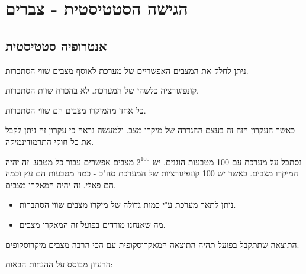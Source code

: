 \documentclass{tstextbook}
\begin{document}
\chapter{הגישה הסטטיסטית - צברים}

\section{אנטרופיה סטטיסטית}

\begin{definition}
ניתן לחלק את המצבים האפשריים של מערכת לאוסף מצבים שווי הסתברות.

\end{definition}
\begin{definition}
קונפיגורציה כלשהי של המערכת. לא בהכרח שוות הסתברות.

\end{definition}
\begin{theorem}
כל אחד מהמיקרו מצבים הם שווי הסתברות.

\end{theorem}
כאשר העקרון הזה זה בעצם ההגדרה של מיקרו מצב. ולמעשה נראה כי עקרון זה ניתן לקבל את כל חוקי התרמודינמיקה.

\begin{example}
נסתכל על מערכת עם 100 מטבעות הוגנים. יש \(2^{100}\) מצבים אפשרים עבור כל מטבע. זה יהיה המיקרו מצבים.
כאשר יש 100 קונפיגורציות של המערכת סה"כ - כמה מטבעות הם עץ וכמה הם פאלי. זה יהיה המאקרו מצבים.

\end{example}
\begin{corollary}
  \begin{itemize}
    \item ניתן לתאר מערכת ע"י כמות גדולה של מיקרו מצבים שווי הסתברות.
    \item מה שאנחנו מודדים בפועל זה המאקרו מצבים.
  \end{itemize}
\end{corollary}
\begin{proposition}
התוצאה שתתקבל בפועל תהיה התוצאה המאקרוסקופית עם הכי הרבה מצבים מיקרוסקופים.

\end{proposition}
הרעיון מבוסס על ההנחות הבאות:
\end{document}
